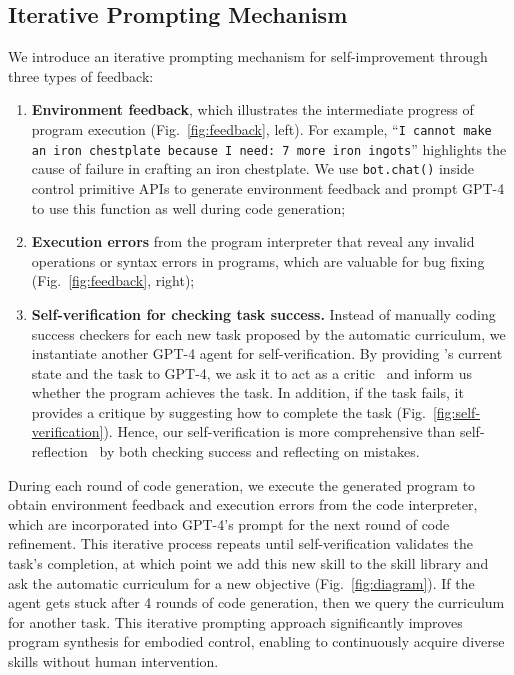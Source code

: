\subsection{Iterative Prompting Mechanism}
\label{sec:method_iterative_prompting}

We introduce an iterative prompting mechanism for self-improvement through three types of feedback: 
\begin{enumerate}[label=(\arabic*)]
    \item \textbf{Environment feedback}, which illustrates the intermediate progress of program execution (Fig.~\ref{fig:feedback}, left). For example, ``\texttt{I cannot make an iron chestplate because I need: 7 more iron ingots}'' highlights the cause of failure in crafting an iron chestplate. We use \texttt{bot.chat()} inside control primitive APIs to generate environment feedback and prompt GPT-4 to use this function as well during code generation; 
    \item \textbf{Execution errors} from the program interpreter that reveal any invalid operations or syntax errors in programs, which are valuable for bug fixing (Fig.~\ref{fig:feedback}, right); 
    \item \textbf{Self-verification for checking task success.} Instead of manually coding success checkers for each new task proposed by the automatic curriculum, we instantiate another GPT-4 agent for self-verification. By providing \voyager's current state and the task to GPT-4, we ask it to act as a critic~\cite{mnih2016asynchronous,schulman2017proximal,lillicrap2016continuous} and inform us whether the program achieves the task. In addition, if the task fails, it provides a critique by suggesting how to complete the task (Fig.~\ref{fig:self-verification}). Hence, our self-verification is more comprehensive than self-reflection~\cite{shinn2023reflexion} by both checking success and reflecting on mistakes.
\end{enumerate}

During each round of code generation, we execute the generated program to obtain environment feedback and execution errors from the code interpreter, which are incorporated into GPT-4's prompt for the next round of code refinement. This iterative process repeats until self-verification validates the task's completion, at which point we add this new skill to the skill library and ask the automatic curriculum for a new objective (Fig.~\ref{fig:diagram}). If the agent gets stuck after 4 rounds of code generation, then we query the curriculum for another task. This iterative prompting approach significantly improves program synthesis for embodied control, enabling \voyager to continuously acquire diverse skills without human intervention.


